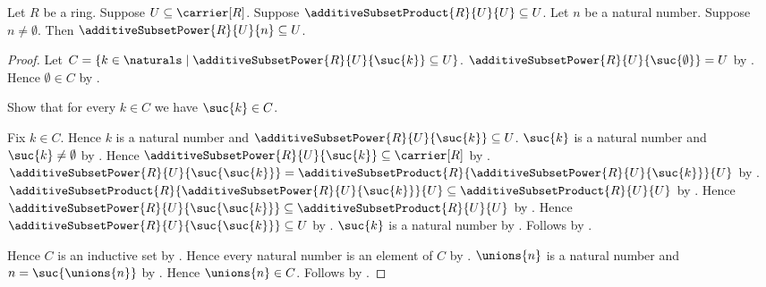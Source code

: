 \begin{theorem}\label{additive_subset_power_subset_of_square_subset}
    Let $R$ be a ring.
    Suppose $U\subseteq\carrier[R]$.
    Suppose $\additiveSubsetProduct{R}{U}{U}\subseteq U$.
    Let $n$ be a natural number.
    Suppose $n\neq\emptyset$.
    Then $\additiveSubsetPower{R}{U}{n}\subseteq U$.
\end{theorem}
\begin{proof}
    Let $C=\{k\in\naturals\mid
        \additiveSubsetPower{R}{U}{\suc{k}}\subseteq U\}$.
    $\additiveSubsetPower{R}{U}{\suc{\emptyset}}=U$ by
        .
    Hence $\emptyset\in C$ by
        .

    Show that for every $k\in C$ we have $\suc{k}\in C$.
    \begin{subproof}
        Fix $k\in C$.
        Hence $k$ is a natural number and
            $\additiveSubsetPower{R}{U}{\suc{k}}\subseteq U$.
        $\suc{k}$ is a natural number and $\suc{k}\neq\emptyset$ by
            .
        Hence $\additiveSubsetPower{R}{U}{\suc{k}}
            \subseteq\carrier[R]$ by
            .
        $\additiveSubsetPower{R}{U}{\suc{\suc{k}}}
            =\additiveSubsetProduct{R}{
                \additiveSubsetPower{R}{U}{\suc{k}}}{U}$ by
            .
        $\additiveSubsetProduct{R}{
            \additiveSubsetPower{R}{U}{\suc{k}}}{U}
            \subseteq\additiveSubsetProduct{R}{U}{U}$ by
            .
        Hence $\additiveSubsetPower{R}{U}{\suc{\suc{k}}}
            \subseteq\additiveSubsetProduct{R}{U}{U}$ by
            \auto.
        Hence $\additiveSubsetPower{R}{U}{\suc{\suc{k}}}
            \subseteq U$ by .
        $\suc{k}$ is a natural number by .
        Follows by \auto.
    \end{subproof}
    Hence $C$ is an inductive set by .
    Hence every natural number is an element of $C$ by
        .
    $\unions{n}$ is a natural number and $n=\suc{\unions{n}}$ by
        .
    Hence $\unions{n}\in C$.
    Follows by \auto.
\end{proof}

